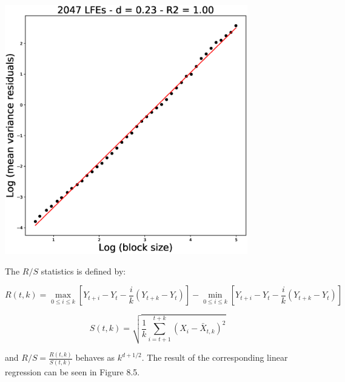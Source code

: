 \documentclass[methods.tex]{subfiles}
\begin{document}
\begin{center}
\includegraphics[width=300pt, trim={0cm 0cm 0cm 0cm},clip]{Figures/longrange/varianceresiduals.eps}
\captionsetup{type=figure}
\end{center}

The $R / S$ statistics is defined by:

\begin{equation}
R \left( t , k \right) = \max_{0 \leq i \leq k} \left[ Y_{t + i} - Y_t - \frac{i}{k} \left( Y_{t + k} - Y_t \right) \right] - \min_{0 \leq i \leq k} \left[ Y_{t + i} - Y_t - \frac{i}{k} \left( Y_{t + k} - Y_t \right) \right]
\end{equation}

\begin{equation}
S \left( t , k \right) = \sqrt{ \frac{1}{k} \sum_{i = t + 1}^{t + k} \left( X_i - \bar{X}_{t , k} \right) ^2 }
\end{equation}

and $R / S = \frac{R \left( t , k \right)}{S \left( t , k \right)}$ behaves as $k^{d + 1 / 2}$. The result of the corresponding linear regression can be seen in Figure 8.5.
\end{document}
